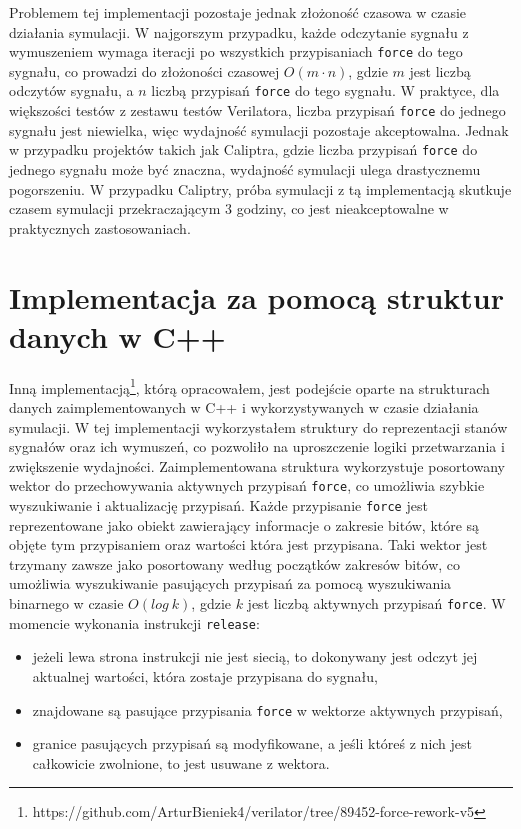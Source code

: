 \documentclass[shortabstract, inz]{iithesis}
\begin{document}
Problemem tej implementacji pozostaje jednak złożoność czasowa w czasie działania symulacji. W najgorszym przypadku, każde odczytanie sygnału z wymuszeniem wymaga iteracji po wszystkich przypisaniach \texttt{force} do tego sygnału, co prowadzi do złożoności czasowej $O(m \cdot n)$, gdzie $m$ jest liczbą odczytów sygnału, a $n$ liczbą przypisań \texttt{force} do tego sygnału. W praktyce, dla większości testów z zestawu testów Verilatora, liczba przypisań \texttt{force} do jednego sygnału jest niewielka, więc wydajność symulacji pozostaje akceptowalna. Jednak w przypadku projektów takich jak Caliptra, gdzie liczba przypisań \texttt{force} do jednego sygnału może być znaczna, wydajność symulacji ulega drastycznemu pogorszeniu. W przypadku Caliptry, próba symulacji z tą implementacją skutkuje czasem symulacji przekraczającym 3 godziny, co jest nieakceptowalne w praktycznych zastosowaniach.

\section{Implementacja za pomocą struktur danych w C++}

Inną implementacją\footnote{https://github.com/ArturBieniek4/verilator/tree/89452-force-rework-v5}, którą opracowałem, jest podejście oparte na strukturach danych zaimplementowanych w C++ i wykorzystywanych w czasie działania symulacji. W tej implementacji wykorzystałem struktury do reprezentacji stanów sygnałów oraz ich wymuszeń, co pozwoliło na uproszczenie logiki przetwarzania i zwiększenie wydajności. Zaimplementowana struktura wykorzystuje posortowany wektor do przechowywania aktywnych przypisań \texttt{force}, co umożliwia szybkie wyszukiwanie i aktualizację przypisań. Każde przypisanie \texttt{force} jest reprezentowane jako obiekt zawierający informacje o zakresie bitów, które są objęte tym przypisaniem oraz wartości która jest przypisana. Taki wektor jest trzymany zawsze jako posortowany według początków zakresów bitów, co umożliwia wyszukiwanie pasujących przypisań za pomocą wyszukiwania binarnego w czasie $O(log\ k)$, gdzie $k$ jest liczbą aktywnych przypisań \texttt{force}.
W momencie wykonania instrukcji \texttt{release}:
\begin{itemize}
    \item jeżeli lewa strona instrukcji nie jest siecią, to dokonywany jest odczyt jej aktualnej wartości, która zostaje przypisana do sygnału,
    \item znajdowane są pasujące przypisania \texttt{force} w wektorze aktywnych przypisań,
    \item granice pasujących przypisań są modyfikowane, a jeśli któreś z nich jest całkowicie zwolnione, to jest usuwane z wektora.
\end{itemize}
\end{document}
